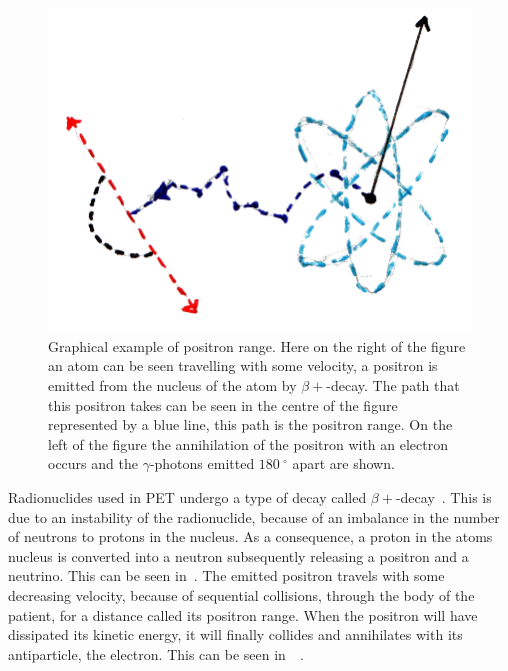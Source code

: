                 \begin{figure}
                    \centering
                    
                    \includegraphics[width=1.0\linewidth]{figures/background_positron_range.png}
                    
                    \captionsetup{singlelinecheck=false, justification=raggedright}
                    \caption{Graphical example of positron range. Here on the right of the figure an atom can be seen travelling with some velocity, a positron is emitted from the nucleus of the atom by $\beta+$-decay. The path that this positron takes can be seen in the centre of the figure represented by a blue line, this path is the positron range. On the left of the figure the annihilation of the positron with an electron occurs and the $\gamma$-photons emitted $\SI{180}{^{\circ}}$ apart are shown.} \label{fig:decay_and_annihilation_positron_range}
                \end{figure}
                
                Radionuclides used in \gls{PET} undergo a type of decay called $\beta+$-decay~. This is due to an instability of the radionuclide, because of an imbalance in the number of neutrons to protons in the nucleus. As a consequence, a proton in the atoms nucleus is converted into a neutron subsequently releasing a positron and a neutrino. This can be seen in~. The emitted positron travels with some decreasing velocity, because of sequential collisions, through the body of the patient, for a distance called its positron range.  When the positron will have dissipated its kinetic energy, it will finally collides and annihilates with its antiparticle, the electron. This can be seen in~~. %
                
